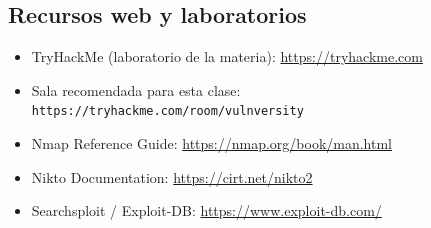 \documentclass[11pt,a4paper]{article}
\begin{document}
\subsection{Recursos web y laboratorios}
\begin{itemize}[leftmargin=*]
  \item TryHackMe (laboratorio de la materia): \url{https://tryhackme.com}
  \item Sala recomendada para esta clase: \texttt{https://tryhackme.com/room/vulnversity}
  \item Nmap Reference Guide: \url{https://nmap.org/book/man.html}
  \item Nikto Documentation: \url{https://cirt.net/nikto2}
  \item Searchsploit / Exploit-DB: \url{https://www.exploit-db.com/}
\end{itemize}
\end{document}
